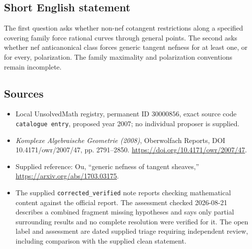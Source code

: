 \documentclass[11pt]{article}
\begin{document}
\subsection{Short English statement}
The first question asks whether non-nef cotangent restrictions along a specified covering family force rational curves through general points. The second asks whether nef anticanonical class forces generic tangent nefness for at least one, or for every, polarization. The family maximality and polarization conventions remain incomplete.
\subsection{Sources}
\begin{itemize}
\item Local UnsolvedMath registry, permanent ID \(30000856\), exact source code \texttt{catalogue entry}, proposed year 2007; no individual proposer is supplied.
\item \emph{Komplexe Algebraische Geometrie (2008)}, Oberwolfach Reports, DOI 10.4171/owr/2007/47, pp. 2791--2850. \url{https://doi.org/10.4171/owr/2007/47}.
\item Supplied reference: Ou, ``generic nefness of tangent sheaves,'' \url{https://arxiv.org/abs/1703.03175}.
\item The supplied \texttt{corrected\_verified} note reports checking mathematical content against the official report. The assessment checked 2026-08-21 describes a combined fragment missing hypotheses and says only partial surrounding results and no complete resolution were verified for it. The open label and assessment are dated supplied triage requiring independent review, including comparison with the supplied clean statement.
\end{itemize}
\end{document}
